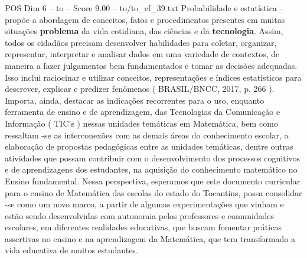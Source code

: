 \begin{textsample}{POS Dim 6 – to – Score 9.00 – to/to\_ef\_39.txt}
Probabilidade e estatística – propõe a abordagem de conceitos, fatos e procedimentos presentes em muitas situações \textbf{problema} da vida cotidiana, das ciências e da \textbf{tecnologia}.
Assim, todos os cidadãos precisam desenvolver habilidades para coletar, organizar, representar, interpretar e analisar dados em uma variedade de contextos, de maneira a fazer julgamentos bem fundamentados e tomar as decisões adequadas.
Isso inclui raciocinar e utilizar conceitos, representações e índices estatísticos para descrever, explicar e predizer fenômenos ( BRASIL/BNCC, 2017, p. 266 ).
Importa, ainda, destacar as indicações recorrentes para o uso, enquanto ferramenta de ensino e de aprendizagem, das Tecnologias da Comunicação e Informação ( TIC’s ) nessas unidades temáticas em Matemática, bem como ressaltam -se as interconexões com as demais áreas do conhecimento escolar, a elaboração de propostas pedagógicas entre as unidades temáticas, dentre outras atividades que possam contribuir com o desenvolvimento dos processos cognitivos e de aprendizagens dos estudantes, na aquisição do conhecimento matemático no Ensino fundamental.
Nessa perspectiva, esperamos que este documento curricular para o ensino de Matemática das escolas do estado do Tocantins, possa consolidar -se como um novo marco, a partir de algumas experimentações que vinham e estão sendo desenvolvidas com autonomia pelos professores e comunidades escolares, em diferentes realidades educativas, que buscam fomentar práticas assertivas no ensino e na aprendizagem da Matemática, que tem transformado a vida educativa de muitos estudantes.

\end{textsample}
